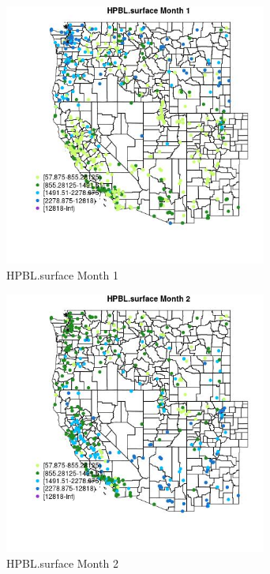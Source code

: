 \begin{figure} 
\centering  
\includegraphics[width=0.77\textwidth]{Code_Outputs/Report_ML_input_PM25_Step4_part_e_de_duplicated_aves_compiled_2019-05-18wNAs_MapObsMo1HPBLsurface.jpg} 
\caption{\label{fig:Report_ML_input_PM25_Step4_part_e_de_duplicated_aves_compiled_2019-05-18wNAsMapObsMo1HPBLsurface}HPBL.surface Month 1} 
\end{figure} 
 

\begin{figure} 
\centering  
\includegraphics[width=0.77\textwidth]{Code_Outputs/Report_ML_input_PM25_Step4_part_e_de_duplicated_aves_compiled_2019-05-18wNAs_MapObsMo2HPBLsurface.jpg} 
\caption{\label{fig:Report_ML_input_PM25_Step4_part_e_de_duplicated_aves_compiled_2019-05-18wNAsMapObsMo2HPBLsurface}HPBL.surface Month 2} 
\end{figure} 
 

